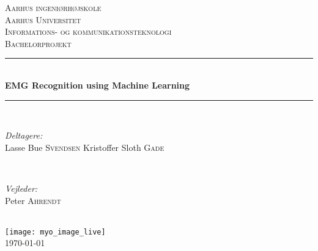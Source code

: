 \documentclass[pdftex, 11pt, a4paper, twoside, danish]{memoir}
\begin{document}
    \begin{titlingpage}
        \newcommand{\HRule}{\rule{\linewidth}{0.5mm}} %
        
        \center %
        \textsc{\LARGE Aarhus ingeniørhøjskole\\Aarhus Universitet}\\[1.5cm] %
        \textsc{\Large Informations- og kommunikationsteknologi}\\[0.5cm] %
        \textsc{\large Bachelorprojekt}\\[0.5cm] %
        
        \HRule \\[0.4cm]
        { \huge \bfseries EMG Recognition using Machine Learning}\\[0.4cm] %
        \HRule \\[1.5cm]
        
        \begin{minipage}{0.4\textwidth}
        	\begin{flushleft} \large
        		\emph{Deltagere:}\\
        		Lasse Bue \textsc{Svendsen}
        		Kristoffer Sloth \textsc{Gade} %
        	\end{flushleft}
        \end{minipage}
        ~
        \begin{minipage}{0.4\textwidth}
        	\begin{flushright} \large
        		\emph{Vejleder:} \\
        		Peter \textsc{Ahrendt} %
        	\end{flushright}
        \end{minipage}\\[2cm]
        
        \texttt{[image: myo\_image\_live]}\\[1.5cm] %
        
        {\large \today}\\[1cm] %
        
        \vfill %
    \end{titlingpage}
    
\end{document}
